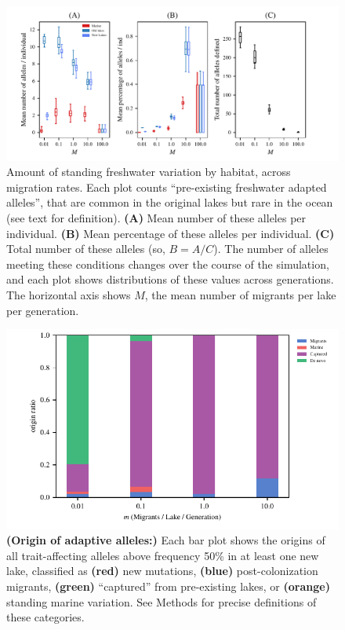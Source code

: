 \documentclass{article}
\begin{document}
\begin{figure}
	\begin{center}
  		\includegraphics{Final_Plots/Freshwater_Alleles.pdf}
  		\caption{
            Amount of standing freshwater variation by habitat, across migration rates.
            Each plot counts ``pre-existing freshwater adapted alleles'',
            that are common in the original lakes but rare in the ocean
            (see text for definition).
            \textbf{(A)} Mean number of these alleles per individual.
            \textbf{(B)} Mean percentage of these alleles per individual.
            \textbf{(C)} Total number of these alleles (so, $B = A/C$).
            The number of alleles meeting these conditions changes over the course of the simulation,
            and each plot shows distributions of these values across generations.
            The horizontal axis shows $M$, the mean number of migrants per lake per generation.
		}
		\label{fig:MPFAI}
	\end{center}
\end{figure}


\begin{figure}
	\begin{center}
  		\includegraphics[width=0.7\linewidth]{Final_Plots/Allele_Origin_2.pdf}
  		\caption{ 
        		\textbf{(Origin of adaptive alleles:)}
        		Each bar plot shows the origins
		of all trait-affecting alleles above frequency 50\% in at least one new lake,
        		classified as
		\textbf{(red)} new mutations,
		\textbf{(blue)} post-colonization migrants,
		\textbf{(green)} ``captured'' from pre-existing lakes, or
		\textbf{(orange)} standing marine variation.
        		See Methods for precise definitions of these categories.
		}
  		\label{fig:Origin}
	\end{center}
\end{figure}
\end{document}
